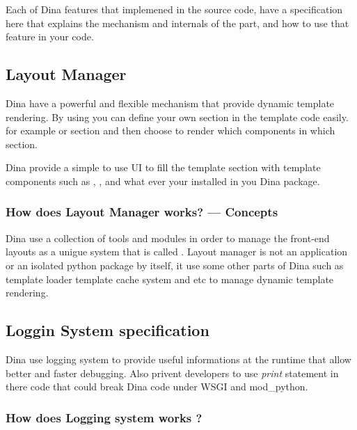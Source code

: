 \documentclass[letterpaper,10pt,english]{manual}
\begin{document}
Each of Dina features that implemened in the source code, have a specification here that explains the mechanism
and internals of the part, and how to use that feature in your code.

\resetcurrentobjects
\hypertarget{--doc-devel/spec/layout}{}

\subsection{Layout Manager}

Dina have a powerful and flexible mechanism that provide dynamic template rendering. By using
 you can define your own section in the template code easily. for example
 or  section and then choose to render which components in which section.

Dina provide a simple to use UI to fill the template section with template components such as
 ,  ,  and what ever your installed in you Dina package.


\subsubsection{How does Layout Manager works? --- Concepts}

Dina use a collection of tools and modules in order to manage the front-end layouts as a unigue
system that is called . Layout manager is not an application or an isolated
python package by itself, it use some other parts of Dina such as template loader template
cache system and etc to manage dynamic template rendering.

\resetcurrentobjects
\hypertarget{--doc-devel/spec/logging}{}

\subsection{Loggin System specification}

Dina use logging system to provide useful informations at the runtime that allow better
and faster debugging. Also privent developers to use \emph{print} statement in there code
that could break Dina code under WSGI and mod\_python.


\subsubsection{How does Logging system works ?}
\end{document}

